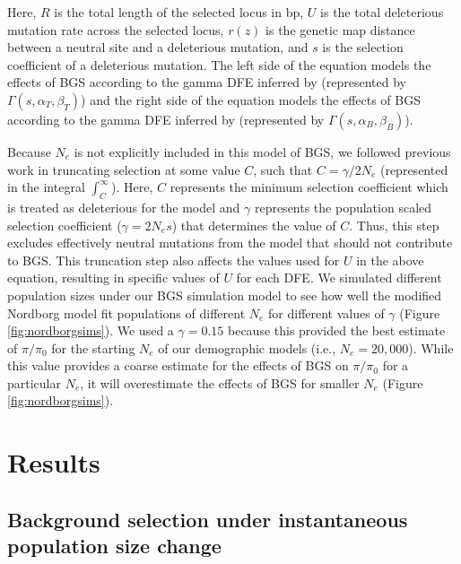 \documentclass[9pt,twocolumn,twoside]{rilabRxiv}
\begin{document}
Here, $R$ is the total length of the selected locus in bp, $U$ is the total deleterious mutation rate across the selected locus, $r(z)$ is the genetic map distance between a neutral site and a deleterious mutation, and $s$ is the selection coefficient of a deleterious mutation.
The left side of the equation models the effects of BGS according to the gamma DFE inferred by \citet{torgerson2009evolutionary} (represented by $\Gamma(s,\alpha_T,\beta_T)$) and the right side of the equation models the effects of BGS according to the gamma DFE inferred by \citet{boyko2008assessing} (represented by $\Gamma(s,\alpha_B,\beta_B)$).

Because $N_e$ is not explicitly included in this model of BGS, we followed previous work \citep{charlesworth2012role, comeron2014background} in truncating selection at some value $C$,
such that $C = \gamma/2N_e$ (represented in the integral $\int^{\infty}_C$).
Here, $C$ represents the minimum selection coefficient which is treated as deleterious for the model and $\gamma$ represents the population scaled selection coefficient ($\gamma = 2N_es$) that determines the value of $C$.
Thus, this step excludes effectively neutral mutations from the model that should not contribute to BGS.
This truncation step also affects the values used for $U$ in the above equation, resulting in specific values of $U$ for each DFE.
We simulated different population sizes under our BGS simulation model to see how well the modified Nordborg model fit populations of different $N_e$ for different values of $\gamma$ (Figure \ref{fig:nordborgsims}).
We used a $\gamma = 0.15$ because this provided the best estimate of $\pi/\pi_0$ for the starting $N_e$ of our demographic models (i.e., $N_e = 20,000$).
While this value provides a coarse estimate for the effects of BGS on $\pi/\pi_0$ for a particular $N_e$, it will overestimate the effects of BGS for smaller $N_e$ (Figure \ref{fig:nordborgsims}).

\section{Results}

\subsection{Background selection under instantaneous population size change}
\end{document}
